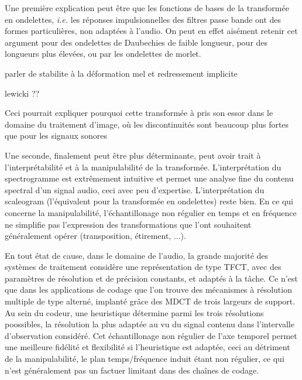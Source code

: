 Une première explication peut être que les fonctions de bases de la transformée en ondelettes, \textit{i.e.} les réponses impulsionnelles des filtres passe bande ont des formes particulières, non adaptées à l'audio. On peut en effet aisément retenir cet argument pour des ondelettes de Daubechies de faible longueur, pour des longueurs plus élevées, ou par les ondelettes de morlet.

parler de stabilite à la déformation mel et redressement implicite

lewicki ??

Ceci pourrait expliquer pourquoi cette transformée à pris son essor dans le domaine du traitement d'image, où les discontinuités sont beaucoup plus fortes que pour les signaux sonores

Une seconde, finalement peut être plus déterminante, peut avoir trait à l'interprétabilité et à la manipulabilité de la transformée. L'interprétation du spectrogramme est extrêmement intuitive et permet une analyse fine du contenu spectral d'un signal audio, ceci avec peu d'expertise. L'interprétation du scaleogram (l'équivalent pour la transformée en ondelettes) reste bien. En ce qui concerne la manipulabilité, l'échantillonage non régulier en temps et en fréquence ne simplifie pas l'expression des transformations que l'ont souhaitent généralement opérer (transposition, étirement, ...).

En tout état de cause, dans le domaine de l'audio, la grande majorité des systèmes de traitement considère une représentation de type TFCT, avec des paramètres de résolution et de précision constants, et adaptés à la tâche. Ce n'est que dans les applications de codage que l'on trouve des mécanismes à résolution multiple de type alterné, implanté grâce des MDCT de trois largeurs de support\cite{brandenburg1999mp3}. Au sein du codeur, une heuristique détermine parmi les trois résolutions poossibles, la résolution la plus adaptée au vu du signal contenu dans l'intervalle d'observation considéré. Cet échantillonage non régulier de l'axe temporel permet une meilleure fidélité et flexibilité si l'heuristique est adaptée, ceci au détriment de la manipulabilité, le plan temps/fréquence induit étant non régulier, ce qui n'est généralement pas un factuer  limitant dans des chaînes de codage.

